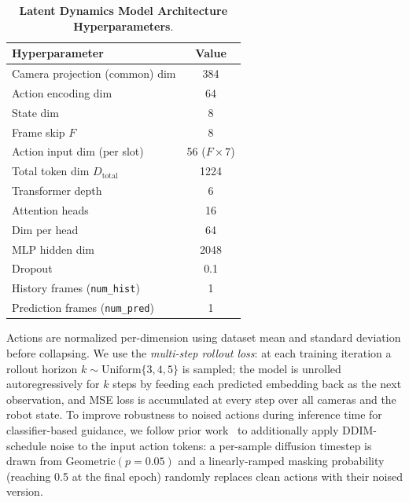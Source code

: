  \begin{table}[h]
  \centering
  \caption{\textbf{Latent Dynamics Model Architecture Hyperparameters}.}
  \label{tab:wm_arch}
  \begin{tabular}{lc}
  \toprule
  \textbf{Hyperparameter} & \textbf{Value} \\
  \midrule
  Camera projection (common) dim & 384 \\
  Action encoding dim             & 64 \\
  State dim                       & 8 \\
  Frame skip $F$                  & 8 \\
  Action input dim (per slot)     & 56 ($F{\times}7$) \\
  Total token dim $D_{\text{total}}$ & 1224 \\
  Transformer depth               & 6 \\
  Attention heads                 & 16 \\
  Dim per head                    & 64 \\
  MLP hidden dim                  & 2048 \\
  Dropout                         & 0.1 \\
  History frames (\texttt{num\_hist}) & 1 \\
  Prediction frames (\texttt{num\_pred}) & 1 \\
  \bottomrule
  \end{tabular}
  \label{tab:latent_dyn_arch}
  \end{table}

  Actions are normalized per-dimension using dataset mean and standard deviation before collapsing.
  We use the \emph{multi-step rollout loss}: at each training iteration a rollout horizon
  $k \sim \mathrm{Uniform}\{3, 4, 5\}$ is sampled; the model is unrolled autoregressively for $k$
  steps by feeding each predicted embedding back as the next observation, and MSE loss is accumulated
  at every step over all cameras and the robot state.
To improve robustness to noised actions during inference time for classifier-based guidance, we follow prior work~\cite{du2025dynaguidesteeringdiffusionpolices} to additionally apply DDIM-schedule noise to the
  input action tokens: a per-sample diffusion timestep is drawn from $\mathrm{Geometric}(p{=}0.05)$
   and a linearly-ramped masking probability (reaching 0.5 at the final epoch)
  randomly replaces clean actions with their noised version.

